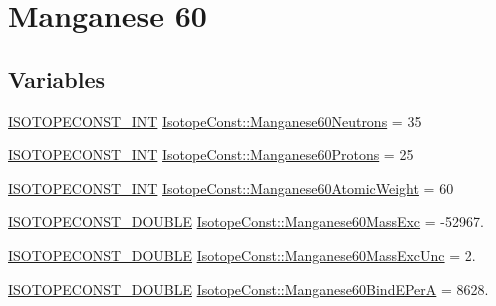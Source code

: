 \hypertarget{group___isotope_const-_manganese-_mn60}{}\section{Manganese 60}
\label{group___isotope_const-_manganese-_mn60}
\subsection*{Variables}
\begin{DoxyCompactItemize}
\item 
\mbox{\hyperlink{group___isotope_const-_macros_ga5f18360b3e99483a35c32d789e62621c}{I\+S\+O\+T\+O\+P\+E\+C\+O\+N\+S\+T\+\_\+\+I\+NT}} \mbox{\hyperlink{group___isotope_const-_manganese-_mn60_ga813a2125ea4eec2924d61da303456233}{Isotope\+Const\+::\+Manganese60\+Neutrons}} = 35
\item 
\mbox{\hyperlink{group___isotope_const-_macros_ga5f18360b3e99483a35c32d789e62621c}{I\+S\+O\+T\+O\+P\+E\+C\+O\+N\+S\+T\+\_\+\+I\+NT}} \mbox{\hyperlink{group___isotope_const-_manganese-_mn60_gad6ad811365123cb45546b1e055dc7714}{Isotope\+Const\+::\+Manganese60\+Protons}} = 25
\item 
\mbox{\hyperlink{group___isotope_const-_macros_ga5f18360b3e99483a35c32d789e62621c}{I\+S\+O\+T\+O\+P\+E\+C\+O\+N\+S\+T\+\_\+\+I\+NT}} \mbox{\hyperlink{group___isotope_const-_manganese-_mn60_ga8c4bbaf1d4985736aac2bb052e6723e9}{Isotope\+Const\+::\+Manganese60\+Atomic\+Weight}} = 60
\item 
\mbox{\hyperlink{group___isotope_const-_macros_ga8f45a7272ce02c0b4c65c44636ed719a}{I\+S\+O\+T\+O\+P\+E\+C\+O\+N\+S\+T\+\_\+\+D\+O\+U\+B\+LE}} \mbox{\hyperlink{group___isotope_const-_manganese-_mn60_ga9cadc4994fdfef2527fea4cc6ff0e001}{Isotope\+Const\+::\+Manganese60\+Mass\+Exc}} = -\/52967.
\item 
\mbox{\hyperlink{group___isotope_const-_macros_ga8f45a7272ce02c0b4c65c44636ed719a}{I\+S\+O\+T\+O\+P\+E\+C\+O\+N\+S\+T\+\_\+\+D\+O\+U\+B\+LE}} \mbox{\hyperlink{group___isotope_const-_manganese-_mn60_ga8ed2019cf125e4ad0b57b98d91280e40}{Isotope\+Const\+::\+Manganese60\+Mass\+Exc\+Unc}} = 2.
\item 
\mbox{\hyperlink{group___isotope_const-_macros_ga8f45a7272ce02c0b4c65c44636ed719a}{I\+S\+O\+T\+O\+P\+E\+C\+O\+N\+S\+T\+\_\+\+D\+O\+U\+B\+LE}} \mbox{\hyperlink{group___isotope_const-_manganese-_mn60_ga592ffe420637bc191a6cfbf7421ed741}{Isotope\+Const\+::\+Manganese60\+Bind\+E\+PerA}} = 8628.
\item 

\end{DoxyCompactItemize}
